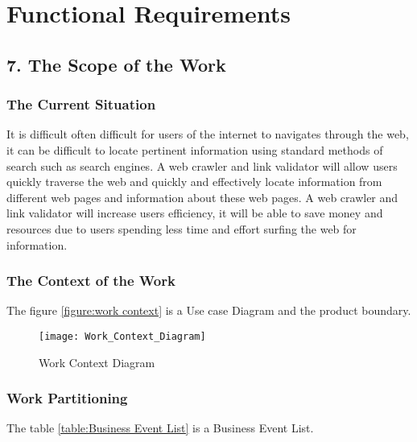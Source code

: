 \documentclass[titlepage]{article}
\begin{document}
\section{Functional Requirements}

\subsection{7. The Scope of the Work }

\subsubsection*{The Current Situation}

It is difficult often difficult for users of the internet to navigates through the web, it can be difficult to locate pertinent information using standard methods of search such as search engines. A web crawler and link validator will allow users quickly traverse the web and quickly and effectively locate information from different web pages and information about these web pages. A web crawler and link validator will increase users efficiency, it will be able to save money and resources due to users spending less time and effort surfing the web for information.\newline

\subsubsection*{The Context of the Work }
The figure \ref{figure:work context} is a Use case Diagram and the product boundary.
\begin{figure}[h!]
  \caption{Work Context Diagram}
  \centering
    \texttt{[image: Work\_Context\_Diagram]}
\end{figure}
\label{figure:work context}
\subsubsection*{Work Partitioning}
The table \ref{table:Business Event List} is a Business Event List.
\end{document}
